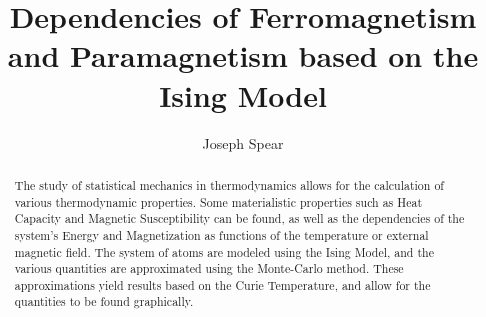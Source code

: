 \documentclass{article}
\begin{document}
\title{Dependencies of Ferromagnetism and Paramagnetism based on the Ising Model}
\author{Joseph Spear}

\maketitle


\begin{abstract}
\justify
The study of statistical mechanics in thermodynamics allows for the calculation of various thermodynamic properties. Some materialistic properties such as Heat Capacity and Magnetic Susceptibility can be found, as well as the dependencies of the system's Energy and Magnetization as functions of the temperature or external magnetic field. The system of atoms are modeled using the Ising Model, and the various quantities are approximated using the Monte-Carlo method. These approximations yield results based on the Curie Temperature, and allow for the quantities to be found graphically.
\end{abstract}
\end{document}
